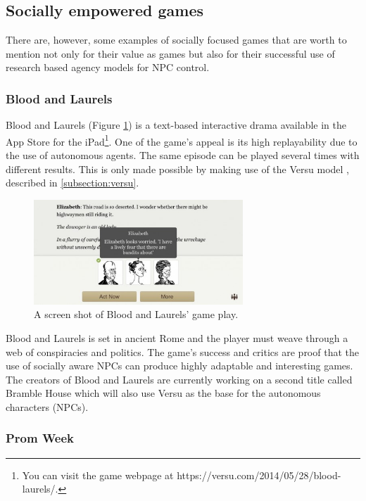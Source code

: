 \subsection{Socially empowered games}

\noindent There are, however, some examples of socially focused games that are worth to mention not only for their value as games but also for their successful use of research based agency models for \ac{NPC} control.

\subsubsection*{Blood and Laurels}
\label{subsection:bloodnlaurel}

Blood and Laurels (Figure \ref{fig:versu}) is a text-based interactive drama available in the App Store for the iPad\footnote{You can visit the game webpage at https://versu.com/2014/05/28/blood-laurels/.}.
One of the game's appeal is its high replayability due to the use of autonomous agents.
The same episode can be played several times with different results.
This is only made possible by making use of the Versu model \cite{evans:versu}, described in \ref{subsection:versu}.

\begin{figure}
  \centering
  \includegraphics[width=0.7\textwidth]{./Images/versu}
  \caption{A screen shot of Blood and Laurels' game play.}
  \label{fig:versu}
\end{figure}

Blood and Laurels is set in ancient Rome and the player must weave through a web of conspiracies and politics.
The game's success and critics are proof that the use of socially aware \acp{NPC} can produce highly adaptable and interesting games.
The creators of Blood and Laurels are currently working on a second title called Bramble House which will also use Versu as the base for the autonomous characters (\acp{NPC}).

\subsubsection*{Prom Week}

